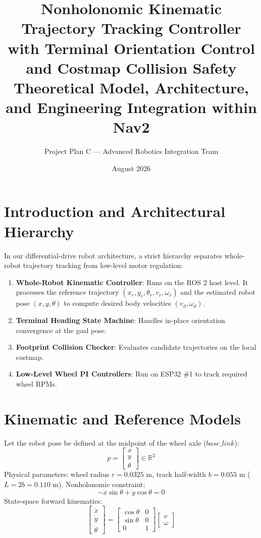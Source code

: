 \documentclass[11pt,a4paper]{article}
\title{\textbf{Nonholonomic Kinematic Trajectory Tracking Controller with Terminal Orientation Control and Costmap Collision Safety}\\
\large Theoretical Model, Architecture, and Engineering Integration within Nav2}
\author{Project Plan C --- Advanced Robotics Integration Team}
\date{August 2026}
\begin{document}
\maketitle

\section{Introduction and Architectural Hierarchy}

In our differential-drive robot architecture, a strict hierarchy separates whole-robot trajectory tracking from low-level motor regulation:
\begin{enumerate}
    \item \textbf{Whole-Robot Kinematic Controller}: Runs on the ROS 2 host level. It processes the reference trajectory $(x_r, y_r, \theta_r, v_r, \omega_r)$ and the estimated robot pose $(x, y, \theta)$ to compute desired body velocities $(v_d, \omega_d)$.
    \item \textbf{Terminal Heading State Machine}: Handles in-place orientation convergence at the goal pose.
    \item \textbf{Footprint Collision Checker}: Evaluates candidate trajectories on the local costmap.
    \item \textbf{Low-Level Wheel PI Controllers}: Run on ESP32 \#1 to track required wheel RPMs.
\end{enumerate}

\section{Kinematic and Reference Models}

Let the robot pose be defined at the midpoint of the wheel axle ($base\_link$):
\begin{equation}
    p = \begin{bmatrix} x \\ y \\ \theta \end{bmatrix} \in \mathbb{R}^3
\end{equation}
Physical parameters: wheel radius $r = 0.0325\text{ m}$, track half-width $b = 0.055\text{ m}$ ($L = 2b = 0.110\text{ m}$). Nonholonomic constraint:
\begin{equation}
    -\dot{x}\sin\theta + \dot{y}\cos\theta = 0
\end{equation}
State-space forward kinematics:
\begin{equation}
    \begin{bmatrix} \dot{x} \\ \dot{y} \\ \dot{\theta} \end{bmatrix} =
    \begin{bmatrix} \cos\theta & 0 \\ \sin\theta & 0 \\ 0 & 1 \end{bmatrix}
    \begin{bmatrix} v \\ \omega \end{bmatrix}
\end{equation}
\end{document}
